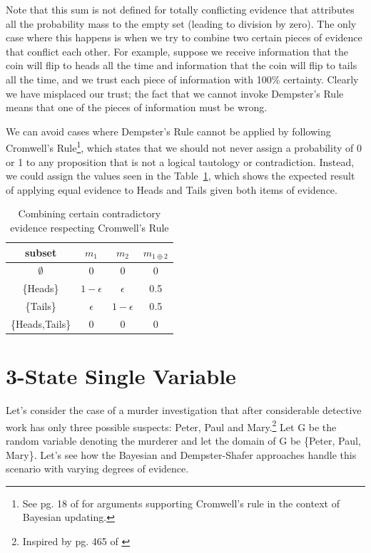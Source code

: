 \documentclass[letterpaper]{article}
\begin{document}
Note that this sum is not defined for totally conflicting evidence that attributes all the probability mass to the empty set (leading to division by zero).  The only case where this happens is when we try to combine two certain pieces of evidence that conflict each other.  For example, suppose we receive information that the coin will flip to heads all the time and information that the coin will flip to tails all the time, and we trust each piece of information with 100\% certainty.  Clearly we have misplaced our trust; the fact that we cannot invoke Dempster's Rule means that one of the pieces of information must be wrong.  

We can avoid cases where Dempster's Rule cannot be applied by following Cromwell's Rule\footnote{See pg. 18 of \cite{Jackman2009} for arguments supporting Cromwell's rule in the context of Bayesian updating.}, which states that we should not never assign a probability of 0 or 1 to any proposition that is not a logical tautology or contradiction.  Instead, we could assign the values seen in the Table~\ref{tab:CombineCoinCromwell}, which shows the expected result of applying equal evidence to Heads and Tails given both items of evidence.

\begin{table}[htbp]
\centering
\caption{Combining certain contradictory evidence respecting Cromwell's Rule}
\begin{tabular}{|c|c|c|c|}
\hline
subset & $m_1$ & $m_2$ & $m_{1 \oplus 2}$ \\
\hline
$\emptyset$ & 0 & 0 & 0 \\
\{Heads\} & $1-\epsilon$ & $\epsilon$ & 0.5 \\
\{Tails\} & $\epsilon$ & $1-\epsilon$ & 0.5 \\
\{Heads,Tails\} & 0 & 0 & 0 \\
\hline
\end{tabular}
\label{tab:CombineCoinCromwell}
\end{table}


\section{3-State Single Variable}
Let's consider the case of a murder investigation that after considerable detective work has only three possible suspects: Peter, Paul and Mary.\footnote{Inspired by pg. 465 of \cite{Pearl1988}}  Let G be the random variable denoting the murderer and let the domain of G be \{Peter, Paul, Mary\}.  Let's see how the Bayesian and Dempster-Shafer approaches handle this scenario with varying degrees of evidence. 
\end{document}
